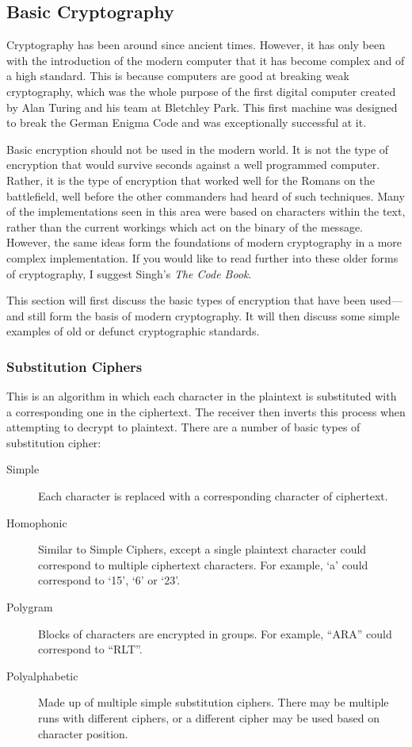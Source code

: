 		\subsection{Basic Cryptography}
			Cryptography has been around since ancient times. 
			However, it has only been with the introduction of the modern computer that it has become complex and of a high standard. 
			This is because computers are good at breaking weak cryptography, which was the whole purpose of the first digital computer created by Alan Turing and his team at Bletchley Park. 
			This first machine was designed to break the German Enigma Code and was exceptionally successful at it. 

			Basic encryption should not be used in the modern world. 
			It is not the type of encryption that would survive seconds against a well programmed computer. 
			Rather, it is the type of encryption that worked well for the Romans on the battlefield, well before the other commanders had heard of such techniques. 
			Many of the implementations seen in this area were based on characters within the text, 
			rather than the current workings which act on the binary of the message. 
			However, the same ideas form the foundations of modern cryptography in a more complex implementation. 
			If you would like to read further into these older forms of cryptography, I suggest Singh's \textit{The Code Book}\cite{CodeBook}.
			
			This section will first discuss the basic types of encryption that have been used---and still form the basis of modern cryptography. 
			It will then discuss some simple examples of old or defunct cryptographic standards.

			\subsubsection{Substitution Ciphers}
				This is an algorithm in which each character in the plaintext is substituted with a corresponding one in the ciphertext. 
				The receiver then inverts this process when attempting to decrypt to plaintext. 
				There are a number of basic types of substitution cipher:
				\begin{description}
					\item[Simple] Each character is replaced with a corresponding character of ciphertext. 
					\item[Homophonic] Similar to Simple Ciphers, except a single plaintext character could correspond to multiple ciphertext characters. 
						For example, `a' could correspond to `15', `6' or `23'. 
					\item[Polygram] Blocks of characters are encrypted in groups. 
						For example, ``ARA'' could correspond to ``RLT''. 
					\item[Polyalphabetic] Made up of multiple simple substitution ciphers. 
						There may be multiple runs with different ciphers, or a different cipher may be used based on character position. 
				\end{description}

